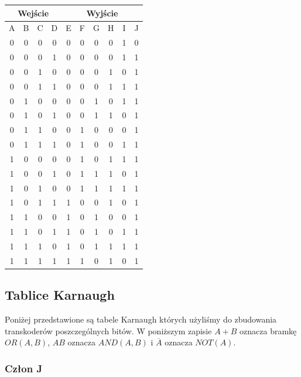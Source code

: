 \documentclass[a4paper]{article}
\begin{document}
\begin{center}
  \begin{tabular}{|c|c|c|c||c|c|c|c|c|c|}
  \hline \multicolumn{4}{|c||}{Wejście} & \multicolumn{6}{|c|}{Wyjście} \\
  \hline A & B & C & D & E & F & G & H & I & J \\
  \hline 0 & 0 & 0 & 0 & 0 & 0 & 0 & 0 & 1 & 0 \\
  \hline 0 & 0 & 0 & 1 & 0 & 0 & 0 & 0 & 1 & 1 \\
  \hline 0 & 0 & 1 & 0 & 0 & 0 & 0 & 1 & 0 & 1 \\
  \hline 0 & 0 & 1 & 1 & 0 & 0 & 0 & 1 & 1 & 1 \\
  \hline 0 & 1 & 0 & 0 & 0 & 0 & 1 & 0 & 1 & 1 \\
  \hline 0 & 1 & 0 & 1 & 0 & 0 & 1 & 1 & 0 & 1 \\
  \hline 0 & 1 & 1 & 0 & 0 & 1 & 0 & 0 & 0 & 1 \\
  \hline 0 & 1 & 1 & 1 & 0 & 1 & 0 & 0 & 1 & 1 \\
  \hline 1 & 0 & 0 & 0 & 0 & 1 & 0 & 1 & 1 & 1 \\
  \hline 1 & 0 & 0 & 1 & 0 & 1 & 1 & 1 & 0 & 1 \\
  \hline 1 & 0 & 1 & 0 & 0 & 1 & 1 & 1 & 1 & 1 \\
  \hline 1 & 0 & 1 & 1 & 1 & 0 & 0 & 1 & 0 & 1 \\
  \hline 1 & 1 & 0 & 0 & 1 & 0 & 1 & 0 & 0 & 1 \\
  \hline 1 & 1 & 0 & 1 & 1 & 0 & 1 & 0 & 1 & 1 \\
  \hline 1 & 1 & 1 & 0 & 1 & 0 & 1 & 1 & 1 & 1 \\
  \hline 1 & 1 & 1 & 1 & 1 & 1 & 0 & 1 & 0 & 1 \\

  \hline 
  \end{tabular}
\end{center}


\subsection{Tablice Karnaugh}
Poniżej przedstawione są tabele Karnaugh których użyliśmy do zbudowania transkoderów poszczególnych bitów.
 W poniższym zapisie $A+B$ oznacza bramkę $OR(A,B)$, $AB$ oznacza $AND(A,B)$ i $\overline{A}$ oznacza $NOT(A)$.
\subsubsection{Człon J}
\end{document}
